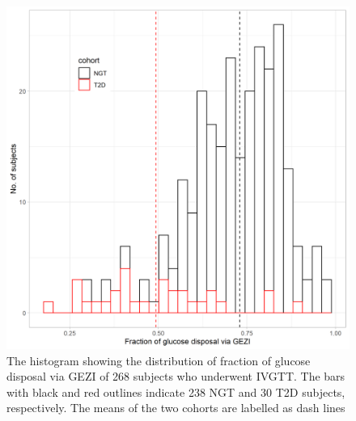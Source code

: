 \documentclass[utf8]{frontiersSCNS} %
\begin{document}
\begin{figure}[h!]
\begin{center}
\includegraphics[width=15cm]{frac.PNG}
\end{center}
\caption{The histogram showing the distribution of fraction of glucose disposal via GEZI of 268 subjects who underwent IVGTT. The bars with black and red outlines indicate 238 NGT and 30 T2D subjects, respectively. The means of the two cohorts are labelled as dash lines}
\label{fig: SI_BMI}
\end{figure}

\end{document}

